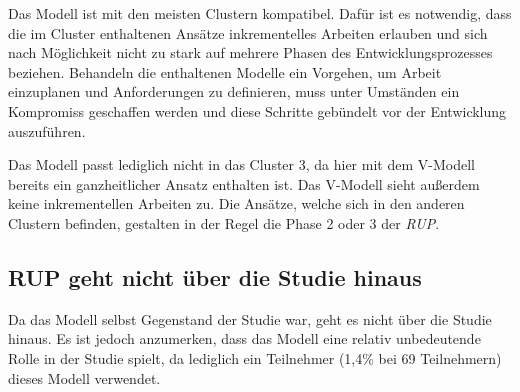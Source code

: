 Das Modell ist mit den meisten Clustern kompatibel. Dafür ist es notwendig, dass die im Cluster enthaltenen Ansätze inkrementelles Arbeiten erlauben und sich nach Möglichkeit nicht zu stark auf mehrere Phasen des Entwicklungsprozesses beziehen. Behandeln die enthaltenen Modelle ein Vorgehen, um Arbeit einzuplanen und Anforderungen zu definieren, muss unter Umständen ein Kompromiss geschaffen werden und diese Schritte gebündelt vor der Entwicklung auszuführen.

Das Modell passt lediglich nicht in das Cluster 3, da hier mit dem V-Modell bereits ein ganzheitlicher Ansatz enthalten ist. Das V-Modell sieht außerdem keine inkrementellen Arbeiten zu. Die Ansätze, welche sich in den anderen Clustern befinden, gestalten in der Regel die Phase 2 oder 3 der \textit{RUP}.

\subsection{RUP geht nicht über die Studie hinaus}
Da das Modell selbst Gegenstand der Studie war, geht es nicht über die Studie hinaus. Es ist jedoch anzumerken, dass das Modell eine relativ unbedeutende Rolle in der Studie spielt, da lediglich ein Teilnehmer (1,4\% bei 69 Teilnehmern) dieses Modell verwendet.